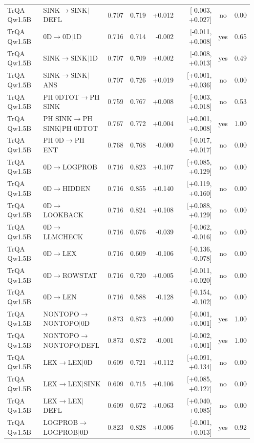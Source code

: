 \begin{longtable}{llrrrrcc}
TrQA Qw1.5B & SINK$\to$SINK$\mid$DEFL & 0.707 & 0.719 & +0.012 & [-0.003, +0.027] & no & 0.00 \\
TrQA Qw1.5B & 0D$\to$0D$\mid$1D & 0.716 & 0.714 & -0.002 & [-0.011, +0.008] & yes & 0.65 \\
TrQA Qw1.5B & SINK$\to$SINK$\mid$1D & 0.707 & 0.709 & +0.002 & [-0.008, +0.013] & yes & 0.49 \\
TrQA Qw1.5B & SINK$\to$SINK$\mid$ANS & 0.707 & 0.726 & +0.019 & [+0.001, +0.036] & no & 0.00 \\
TrQA Qw1.5B & PH 0DTOT$\to$PH SINK & 0.759 & 0.767 & +0.008 & [-0.003, +0.018] & no & 0.53 \\
TrQA Qw1.5B & PH SINK$\to$PH SINK$\mid$PH 0DTOT & 0.767 & 0.772 & +0.004 & [+0.001, +0.008] & yes & 1.00 \\
TrQA Qw1.5B & PH 0D$\to$PH ENT & 0.768 & 0.768 & -0.000 & [-0.017, +0.017] & no & 0.00 \\
TrQA Qw1.5B & 0D$\to$LOGPROB & 0.716 & 0.823 & +0.107 & [+0.085, +0.129] & no & 0.00 \\
TrQA Qw1.5B & 0D$\to$HIDDEN & 0.716 & 0.855 & +0.140 & [+0.119, +0.160] & no & 0.00 \\
TrQA Qw1.5B & 0D$\to$LOOKBACK & 0.716 & 0.824 & +0.108 & [+0.088, +0.129] & no & 0.00 \\
TrQA Qw1.5B & 0D$\to$LLMCHECK & 0.716 & 0.676 & -0.039 & [-0.062, -0.016] & no & 0.00 \\
TrQA Qw1.5B & 0D$\to$LEX & 0.716 & 0.609 & -0.106 & [-0.136, -0.078] & no & 0.00 \\
TrQA Qw1.5B & 0D$\to$ROWSTAT & 0.716 & 0.720 & +0.005 & [-0.011, +0.020] & no & 0.00 \\
TrQA Qw1.5B & 0D$\to$LEN & 0.716 & 0.588 & -0.128 & [-0.154, -0.102] & no & 0.00 \\
TrQA Qw1.5B & NONTOPO$\to$NONTOPO$\mid$0D & 0.873 & 0.873 & +0.000 & [-0.001, +0.001] & yes & 1.00 \\
TrQA Qw1.5B & NONTOPO$\to$NONTOPO$\mid$DEFL & 0.873 & 0.872 & -0.001 & [-0.002, +0.001] & yes & 1.00 \\
TrQA Qw1.5B & LEX$\to$LEX$\mid$0D & 0.609 & 0.721 & +0.112 & [+0.091, +0.134] & no & 0.00 \\
TrQA Qw1.5B & LEX$\to$LEX$\mid$SINK & 0.609 & 0.715 & +0.106 & [+0.085, +0.127] & no & 0.00 \\
TrQA Qw1.5B & LEX$\to$LEX$\mid$DEFL & 0.609 & 0.672 & +0.063 & [+0.040, +0.085] & no & 0.00 \\
TrQA Qw1.5B & LOGPROB$\to$LOGPROB$\mid$0D & 0.823 & 0.828 & +0.006 & [-0.001, +0.013] & yes & 0.92 \\

\end{longtable}
